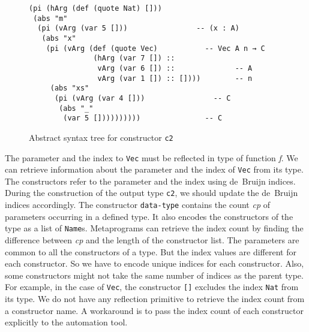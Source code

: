 \documentclass[sigplan,10pt]{acmart}
\begin{document}
\begin{figure}
\begin{center}
\begingroup
\fontsize{7pt}{9pt}\selectfont
\begin{Verbatim}[frame = single]
(pi (hArg (def (quote Nat) []))
 (abs "m"
  (pi (vArg (var 5 []))                -- (x : A)
   (abs "x"
    (pi (vArg (def (quote Vec)           -- Vec A n → C
               (hArg (var 7 []) ::              
                vArg (var 6 []) ::              -- A
                vArg (var 1 []) :: [])))        -- n
     (abs "xs"
      (pi (vArg (var 4 []))                -- C 
       (abs "_" 
        (var 5 [])))))))))               -- C
\end{Verbatim}
\endgroup
\end{center}
\caption{Abstract syntax tree for constructor {\tt c2}}
\label{fig:ast-d}
\end{figure}

\normalsize

The parameter and the index to {\tt Vec} must be reflected in type of function \emph{f}. We can retrieve information about the parameter and the index of {\tt Vec} from its type. The constructors refer to the parameter and the index using de~Bruijn indices. During the construction of the output type {\tt c2}, we  should update the de~Bruijn indices accordingly. The constructor {\tt data-type} contains the count \emph{cp} of parameters occurring in a defined type. It also encodes the constructors of the type as a list of \texttt{Name}s. Metaprograms can retrieve the index count by finding the difference between \emph{cp} and the length of the constructor list. The parameters are common to all the constructors of a type. But the index values are different for each constructor. So we have to encode unique indices for each constructor. Also, some constructors might not take the same number of indices as the parent type. For example, in the case of {\tt Vec}, the constructor {\tt []} excludes the index {\tt Nat} from its type. We do not have any reflection primitive to retrieve the index count from a constructor name. A workaround is to pass the index count of each constructor explicitly to the automation tool.
\end{document}
